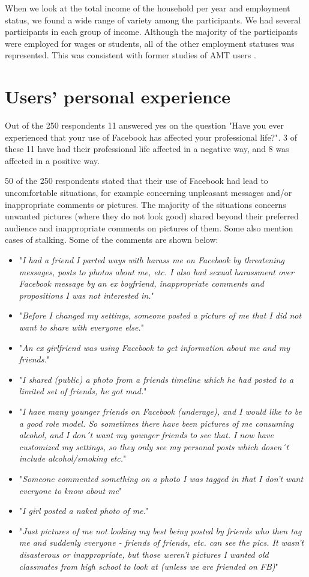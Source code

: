 When we look at the total income of the household per year and employment status, we found a wide range of variety among the participants. We had several participants in each group of income. Although the majority of the participants were employed for wages or students, all of the other employment statuses was represented. This was consistent with former studies of AMT users \cite{incentivesAmt}. 



\section{Users' personal experience}
Out of the 250 respondents 11 answered yes on the question "Have you ever experienced that your use of Facebook has affected your professional life?". 3 of these 11 have had their professional life affected in a negative way, and 8 was affected in a positive way. 

50 of the 250 respondents stated that their use of Facebook had lead to uncomfortable situations, for example concerning unpleasant messages and/or inappropriate comments or pictures. The majority of the situations concerns unwanted pictures (where they do not look good) shared beyond their preferred audience and inappropriate comments on pictures of them. Some also mention cases of stalking. Some of the comments are shown below:

\begin{itemize} 
\item "\textit{I had a friend I parted ways with harass me on Facebook by threatening messages, posts to photos about me, etc. I also had sexual harassment over Facebook message by an ex boyfriend, inappropriate comments and propositions I was not interested in.}"
\item "\textit{Before I changed my settings, someone posted a picture of me that I did not want to share with everyone else.}"
\item "\textit{An ex girlfriend was using Facebook to get information about me and my friends.}"
\item "\textit{I shared (public) a photo from a friends timeline which he had posted to a limited set of friends, he got mad.}"
\item "\textit{I have many younger friends on Facebook (underage), and I would like to be a good role model. So sometimes there have been pictures of me consuming alcohol, and I don´t want my younger friends to see that. I now have customized my settings, so they only see my personal posts which dosen´t include alcohol/smoking etc.}"
\item "\textit{Someone commented something on a photo I was tagged in that I don't want everyone to know about me}"
\item "\textit{I girl posted a naked photo of me.}"
\item "\textit{Just pictures of me not looking my best being posted by friends who then tag me and suddenly everyone - friends of friends, etc. can see the pics. It wasn't disasterous or inappropriate, but those weren't pictures I wanted old classmates from high school to look at (unless we are friended on FB)}"
\end{itemize}

